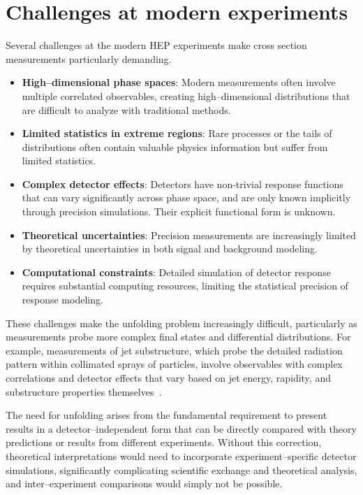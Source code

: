 \section{Challenges at modern experiments}
Several challenges at the modern HEP experiments make cross section measurements particularly demanding.

    \begin{itemize}
        \item \textbf{High--dimensional phase spaces}: Modern measurements often involve multiple correlated observables, creating high--dimensional distributions that are difficult to analyze with traditional methods.
        \item \textbf{Limited statistics in extreme regions}: Rare processes or the tails of distributions often contain valuable physics information but suffer from limited statistics.
        \item \textbf{Complex detector effects}: Detectors have non-trivial response functions that can vary significantly across phase space, and are only known implicitly through precision simulations. Their explicit functional form is unknown.
        \item \textbf{Theoretical uncertainties}: Precision measurements are increasingly limited by theoretical uncertainties in both signal and background modeling.
        \item \textbf{Computational constraints}: Detailed simulation of detector response requires substantial computing resources, limiting the statistical precision of response modeling.
    \end{itemize}
    These challenges make the unfolding problem increasingly difficult, particularly as measurements probe more complex final states and differential distributions.
    For example, measurements of jet substructure, which probe the detailed radiation pattern within collimated sprays of particles, involve observables with complex correlations and detector effects that vary based on jet energy, rapidity, and substructure properties themselves~\cite{Larkoski2020JetLearning, kogler_jet_2019, mozer_jet_2017}.
    
    The need for unfolding arises from the fundamental requirement to present results in a detector--independent form that can be directly compared with theory predictions or results from different experiments.
    Without this correction, theoretical interpretations would need to incorporate experiment--specific detector simulations, significantly complicating scientific exchange and theoretical analysis, and inter--experiment comparisons would simply not be possible.

